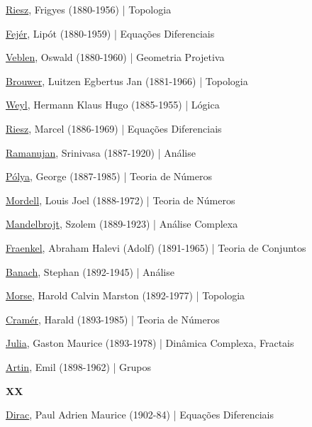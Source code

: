 \documentclass[12pt,a4paper]{article}
\begin{document}
			\href{http://en.wikipedia.org/wiki/Frigyes_Riesz}{Riesz}, Frigyes (1880-1956) | Topologia

			\href{http://pt.wikipedia.org/wiki/Lip\%C3\%B3t_Fej\%C3\%A9r}{Fej\'er}, Lip\'ot (1880-1959) | Equa\c{c}\~oes Diferenciais

			\href{http://en.wikipedia.org/wiki/Oswald_Veblen}{Veblen}, Oswald (1880-1960) | Geometria Projetiva

			\href{http://en.wikipedia.org/wiki/L._E._J._Brouwer}{Brouwer}, Luitzen Egbertus Jan (1881-1966) | Topologia

			\href{http://en.wikipedia.org/wiki/Weyl}{Weyl}, Hermann Klaus Hugo (1885-1955) | L\'ogica

			\href{http://en.wikipedia.org/wiki/Marcel_Riesz}{Riesz}, Marcel (1886-1969) | Equa\c{c}\~oes Diferenciais

			\href{http://en.wikipedia.org/wiki/Srinivasa_Aiyangar_Ramanujan}{Ramanujan}, Srinivasa (1887-1920) | An\'alise

			\href{http://en.wikipedia.org/wiki/Polya}{P\'olya}, George (1887-1985) | Teoria de N\'umeros

			\href{http://en.wikipedia.org/wiki/Louis_Mordell}{Mordell}, Louis Joel (1888-1972) | Teoria de N\'umeros

			\href{http://en.wikipedia.org/wiki/Szolem_Mandelbrojt}{Mandelbrojt}, Szolem (1889-1923) | An\'alise Complexa

			\href{http://en.wikipedia.org/wiki/Abraham_Fraenkel}{Fraenkel}, Abraham Halevi (Adolf) (1891-1965) | Teoria de Conjuntos

			\href{http://en.wikipedia.org/wiki/Banach}{Banach}, Stephan (1892-1945) | An\'alise

			\href{http://en.wikipedia.org/wiki/Marston_Morse}{Morse}, Harold Calvin Marston (1892-1977) | Topologia

			\href{http://en.wikipedia.org/wiki/Harald_Cram\%C3\%A9r}{Cram\'er}, Harald (1893-1985) | Teoria de N\'umeros

			\href{http://en.wikipedia.org/wiki/Gaston_Julia}{Julia}, Gaston Maurice (1893-1978) | Din\^amica Complexa, Fractais

			\href{http://en.wikipedia.org/wiki/Artin_L-function}{Artin}, Emil (1898-1962) | Grupos

			\begin{flushright}
			\end{flushright}

			\textbf{XX}

			\href{http://en.wikipedia.org/wiki/Paul_Dirac}{Dirac}, Paul Adrien Maurice (1902-84) | Equa\c{c}\~oes Diferenciais
\end{document}
